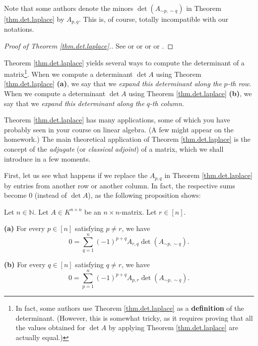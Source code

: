 Note that some authors denote the minors $\det\left(  A_{\sim p,\sim
q}\right)  $ in Theorem \ref{thm.det.laplace} by $A_{p,q}$. This is, of
course, totally incompatible with our notations.

\begin{proof}
[Proof of Theorem \ref{thm.det.laplace}.]See \cite[Theorem 6.82]{detnotes} or
\cite[Lemma 4.7.7]{Ford21} or \cite[5.8 and 5.8']{Laue-det} or
\cite[Proposition B.24 and Proposition B.25]{Strick13} or \cite[Theorem
9.48]{Loehr-BC}.
\end{proof}

Theorem \ref{thm.det.laplace} yields several ways to compute the determinant
of a matrix\footnote{In fact, some authors use Theorem \ref{thm.det.laplace}
as a \textbf{definition} of the determinant. (However, this is somewhat
tricky, as it requires proving that all the values obtained for $\det A$ by
applying Theorem \ref{thm.det.laplace} are actually equal.)}. When we compute
a determinant $\det A$ using Theorem \ref{thm.det.laplace} \textbf{(a)}, we
say that we \emph{expand this determinant along the }$p$\emph{-th row}. When
we compute a determinant $\det A$ using Theorem \ref{thm.det.laplace}
\textbf{(b)}, we say that we \emph{expand this determinant along the }%
$q$\emph{-th column}.

Theorem \ref{thm.det.laplace} has many applications, some of which you have
probably seen in your course on linear algebra. (A few might appear on the
homework.) The main theoretical application of Theorem \ref{thm.det.laplace}
is the concept of the \emph{adjugate} (or \emph{classical adjoint}) of a
matrix, which we shall introduce in a few moments.

First, let us see what happens if we replace the $A_{p,q}$ in Theorem
\ref{thm.det.laplace} by entries from another row or another column. In fact,
the respective sums become $0$ (instead of $\det A$), as the following
proposition shows:

\begin{proposition}
\label{prop.det.laplace.0}Let $n\in\mathbb{N}$. Let $A\in K^{n\times n}$ be an
$n\times n$-matrix. Let $r\in\left[  n\right]  $. \medskip

\textbf{(a)} For every $p\in\left[  n\right]  $ satisfying $p\neq r$, we have%
\[
0=\sum_{q=1}^{n}\left(  -1\right)  ^{p+q}A_{r,q}\det\left(  A_{\sim p,\sim
q}\right)  .
\]


\textbf{(b)} For every $q\in\left[  n\right]  $ satisfying $q\neq r$, we have%
\[
0=\sum_{p=1}^{n}\left(  -1\right)  ^{p+q}A_{p,r}\det\left(  A_{\sim p,\sim
q}\right)  .
\]

\end{proposition}

